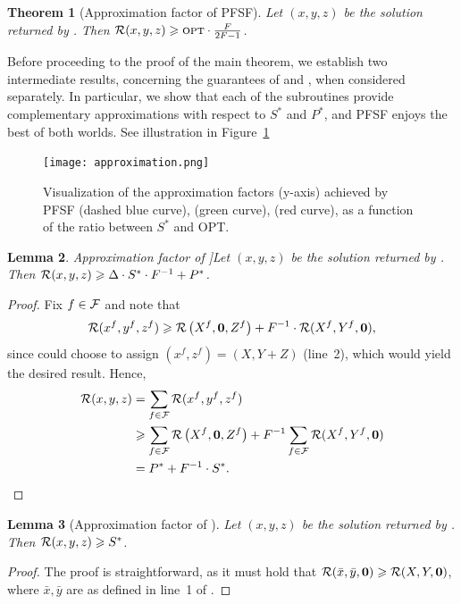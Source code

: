 \documentclass[conference]{IEEEtran}
\newtheorem{theorem}{Theorem}[section]
\newtheorem{lemma}[theorem]{Lemma}
\begin{document}
\begin{theorem}[Approximation factor of PFSF]\label{thm:main}
  Let $(x,y,z)$ be the solution returned by \alg. Then $\mathcal{R}(x,y,z)\geqslant \textsc{opt}\cdot \frac{F}{2F-1}$. 
\end{theorem}

Before proceeding to the proof of the main theorem, we establish two intermediate results, concerning the guarantees of \private and \shared, when considered separately. In particular, we show that each of the subroutines provide complementary approximations with respect to $S^*$ and $P^*$, and PFSF enjoys the best of both worlds. See illustration in Figure~\ref{fig:approximation}

\begin{figure}[!ht]
    \centering
    \texttt{[image: approximation.png]}
    \caption{Visualization of the approximation factors (y-axis) achieved by PFSF (dashed blue curve), \private (green curve), \shared (red curve), as a function of the ratio between $S^*$ and OPT.}
    \label{fig:approximation}
\end{figure}


\begin{lemma}Approximation factor of \private]\label{lem:private}
  Let $(x,y,z)$ be the solution returned by \private. Then $\mathcal{R}(x,y,z)\geqslant \Delta\cdot  S^*\cdot F^{-1}+P^*$.
\end{lemma}
\begin{proof}
  Fix $f\in \mathcal{F}$ and note that
  \[\mathcal{R}(x^f,y^f,z^f) \geqslant \mathcal{R}\left({X}^f,\bm{0},{Z}^f\right)+F^{-1}\cdot \mathcal{R}(X^f,Y^f,\bm{0}),\]
  since \private could choose to assign $(x^f,z^f)=(X,Y+Z)$ (line~2), which would yield the desired result. Hence,
\begin{align*}
  \mathcal{R}(x,y,z)&=\sum_{f\in \mathcal{F}}\mathcal{R}(x^f,y^f,z^f)\\ & \geqslant  \sum_{f\in \mathcal{F}}\mathcal{R}\left({X}^f,\bm{0},{Z}^f\right)+F^{-1}\sum_{f\in \mathcal{F}}\mathcal{R} (X^f,Y^f,\bm{0}) \\ 
& =P^* + F^{-1}\cdot S^*.
\end{align*}
\end{proof}

\begin{lemma}[Approximation factor of \shared]\label{lem:shared}
  Let $(x,y,z)$ be the solution returned by \shared. Then $\mathcal{R}(x,y,z)\geqslant S^*$.
\end{lemma}
\begin{proof}
  The proof is straightforward, as it must hold that $\mathcal{R}(\bar{x},\bar{y},\bm{0})\geqslant \mathcal{R}(X,Y,\bm{0})$, where $\bar{x},\bar{y}$ are as defined in line~1 of \shared.
\end{proof}
\end{document}
